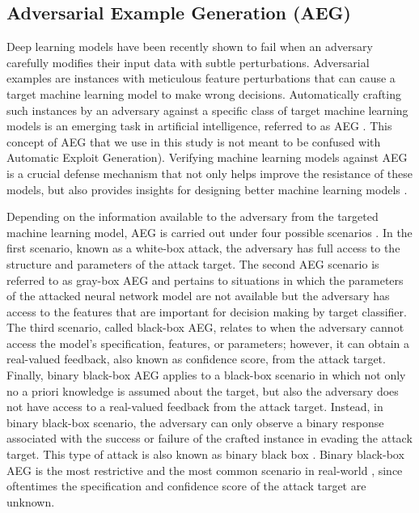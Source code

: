 \documentclass[letterpaper]{article}
\begin{document}
\subsection{Adversarial Example Generation (AEG)}

Deep learning models have been recently shown to fail when an adversary carefully modifies their input data with subtle perturbations. Adversarial examples are instances with meticulous feature perturbations that can cause a target machine learning model to make wrong decisions. Automatically crafting such instances by an adversary against a specific class of target machine learning models is an emerging task in artificial intelligence, referred to as AEG  \cite{goodfellow2018making}. This concept of AEG that we use in this study is not meant to be confused with Automatic Exploit Generation). Verifying machine learning models against AEG is a crucial defense mechanism that not only helps improve the resistance of these models, but also provides insights for designing better machine learning models \cite {goodfellow2018making}.

Depending on the information available to the adversary from the targeted machine learning model, AEG is carried out under four possible scenarios \cite{qiu2019review,anderson2018learning}. In the first scenario, known as a white-box attack, the adversary has full access to the structure and parameters of the attack target. The second AEG scenario is referred to as gray-box AEG and pertains to situations in which the parameters of the attacked neural network model are not available but the adversary has access to the features that are important for decision making by target classifier. The third scenario, called black-box AEG, relates to when the adversary cannot access the model's specification, features, or parameters; however, it can obtain a real-valued feedback, also known as confidence score, from the attack target. Finally, binary black-box AEG applies to a black-box scenario in which not only no a priori knowledge is assumed about the target, but also the adversary does not have access to a real-valued feedback from the attack target. Instead, in binary black-box scenario, the adversary can only observe a binary response associated with the success or failure of the crafted instance in evading the attack target. This type of attack is also known as binary black box \cite{anderson2018learning}. Binary black-box AEG is the most restrictive and the most common scenario in real-world \cite{fleshman2019non}, since oftentimes the specification and confidence score of the attack target are unknown.
\end{document}
